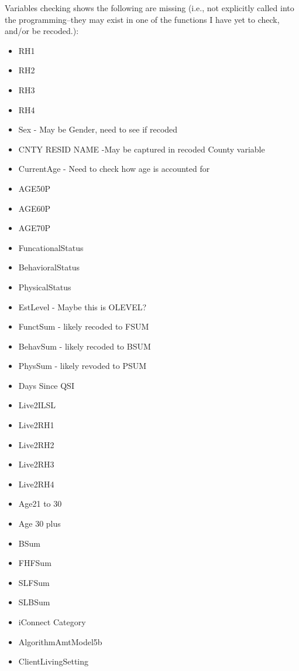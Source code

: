 \documentclass[12pt, letterpaper]{article}
\begin{document}
Variables checking shows the following are missing (i.e., not explicitly called into the programming--they may exist in one of the functions I have yet to check, and/or be recoded.):\\
\begin{itemize}\\
\noindent \textbf{Possibly already included, or may need to be considered.}
	\item RH1
	\item RH2
	\item RH3
	\item RH4
	\item Sex - May be Gender, need to see if recoded
	\item CNTY RESID NAME -May be captured in recoded County variable
	\item CurrentAge - Need to check how age is accounted for
	\item AGE50P
	\item AGE60P
	\item AGE70P
	\item FuncationalStatus
	\item BehavioralStatus
	\item PhysicalStatus
	\item EstLevel - Maybe this is OLEVEL?
	\item FunctSum - likely recoded to FSUM
	\item BehavSum - likely recoded to BSUM
	\item PhysSum - likely revoded to PSUM
	\item Days Since QSI
	\item Live2ILSL
	\item Live2RH1
	\item Live2RH2
	\item Live2RH3
	\item Live2RH4
	\item Age21 to 30
	\item Age 30 plus
	\item BSum
	\item FHFSum
	\item SLFSum
	\item SLBSum
	\item iConnect Category
	\item AlgorithmAmtModel5b
	\item ClientLivingSetting\\
	

\end{itemize}
\end{document}
